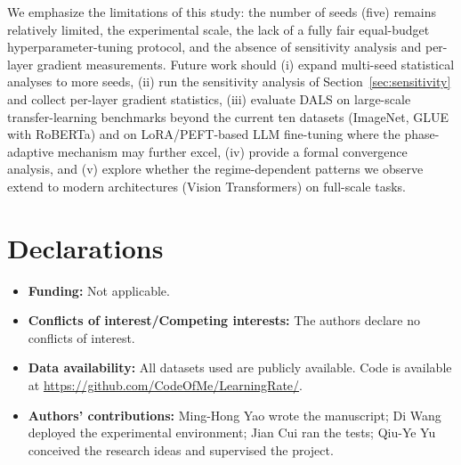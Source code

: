 \documentclass[a4paper,fleqn]{cas-dc}
\begin{document}
We emphasize the limitations of this study: the number of seeds (five) remains relatively limited, the experimental scale, the lack of a fully fair equal-budget hyperparameter-tuning protocol, and the absence of sensitivity analysis and per-layer gradient measurements. Future work should (i) expand multi-seed statistical analyses to more seeds, (ii) run the sensitivity analysis of Section~\ref{sec:sensitivity} and collect per-layer gradient statistics, (iii) evaluate DALS on large-scale transfer-learning benchmarks beyond the current ten datasets (ImageNet, GLUE with RoBERTa) and on LoRA/PEFT-based LLM fine-tuning where the phase-adaptive mechanism may further excel, (iv) provide a formal convergence analysis, and (v) explore whether the regime-dependent patterns we observe extend to modern architectures (Vision Transformers) on full-scale tasks.

\section*{Declarations}

\begin{itemize}
\item \textbf{Funding:} Not applicable.
\item \textbf{Conflicts of interest/Competing interests:} The authors declare no conflicts of interest.
\item \textbf{Data availability:} All datasets used are publicly available. Code is available at \url{https://github.com/CodeOfMe/LearningRate/}.
\item \textbf{Authors' contributions:} Ming-Hong Yao wrote the manuscript; Di Wang deployed the experimental environment; Jian Cui ran the tests; Qiu-Ye Yu conceived the research ideas and supervised the project.
\end{itemize}

\printcredits


\gdef\bibfont{\fontsize{8pt}{9pt}\selectfont}

\end{document}
